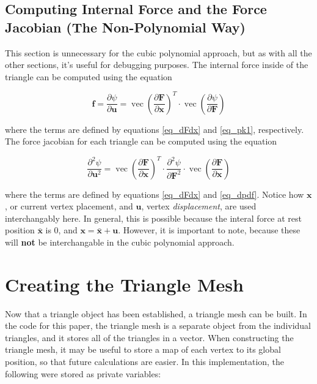 \documentclass[twocolumn,10pt]{asme2ej}
\DeclareMathOperator{\vect}{vec}
\begin{document}
\subsection{Computing Internal Force and the Force Jacobian (The Non-Polynomial Way)}

This section is unnecessary for the cubic polynomial approach, but as with all the other sections, it's useful for debugging purposes. The internal force inside of the triangle can be computed using the equation

\begin{equation}
\bm{f} = \frac{\partial \psi}{\partial \bm{u}} = \vect \left(\frac{\partial \bm{F}}{\partial \bm{x}}\right)^T\cdot \vect \left(\frac{\partial \psi}{\partial \bm{F}}\right)
\label{eq_triforce}
\end{equation}

where the terms are defined by equations \ref{eq_dFdx} and \ref{eq_pk1}, respectively. The force jacobian for each triangle can be computed using the equation

\begin{equation}
\frac{\partial^2 \psi}{\partial \bm{u}^2} = \vect \left(\frac{\partial \bm{F}}{\partial \bm{x}}\right)^T\cdot \frac{\partial^2 \psi}{\partial \bm{F}^2}\cdot \vect \left(\frac{\partial \bm{F}}{\partial \bm{x}}\right)
\label{eq_trijacob}
\end{equation}

where the terms are defined by equations \ref{eq_dFdx} and \ref{eq_dpdf}. Notice how $\bm{x}$, or current vertex placement, and $\bm{u}$, vertex \textit{displacement}, are used interchangably here. In general, this is possible because the interal force at rest position $\bm{\bar{x}}$ is $0$, and $\bm{x} = \bm{\bar{x}} + \bm{u}$. However, it is important to note, because these will \textbf{not} be interchangable in the cubic polynomial approach.


\section{Creating the Triangle Mesh}

Now that a triangle object has been established, a triangle mesh can be built. In the code for this paper, the triangle mesh is a separate object from the individual triangles, and it stores all of the triangles in a vector. When constructing the triangle mesh, it may be useful to store a map of each vertex to its global position, so that future calculations are easier. In this implementation, the following were stored as private variables:
\end{document}
